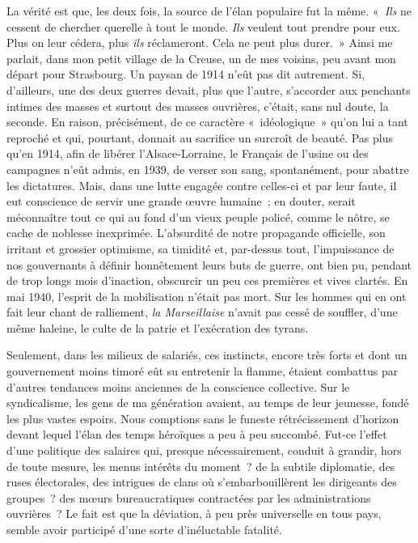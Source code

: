 \documentclass[french,twoside]{book} %
\begin{document}
La vérité est que, les deux fois, la source de l’élan   populaire fut la même. « {\itshape Ils} ne cessent de chercher querelle à tout le monde. {\itshape Ils} veulent tout prendre pour eux. Plus on leur cédera, plus {\itshape ils} réclameront. Cela ne peut plus durer. » Ainsi me parlait, dans mon petit village de la Creuse, un de mes voisins, peu avant mon départ pour Strasbourg. Un paysan de 1914 n’eût pas dit autrement. Si, d’ailleurs, une des deux guerres devait, plus que l’autre, s’accorder aux penchants intimes des masses et surtout des masses ouvrières, c’était, sans nul doute, la seconde. En raison, précisément, de ce caractère « idéologique » qu’on lui a tant reproché et qui, pourtant, donnait au sacrifice un surcroît de beauté. Pas plus qu’en 1914, afin de libérer l’Alsace-Lorraine, le Français de l’usine ou des campagnes n’eût admis, en 1939, de verser son sang, spontanément, pour abattre les dictatures. Mais, dans une lutte engagée contre celles-ci et par leur faute, il eut conscience de servir une grande œuvre humaine ; en douter, serait méconnaître tout ce qui au fond d’un vieux peuple policé, comme le nôtre, se cache de noblesse inexprimée. L’absurdité de notre propagande officielle, son irritant et grossier optimisme, sa timidité et, par-dessus tout, l’impuissance de nos gouvernants à définir honnêtement leurs buts de guerre, ont bien pu, pendant de trop longs mois d’inaction, obscurcir un peu ces premières et vives clartés. En mai 1940, l’esprit de la mobilisation n’était pas mort. Sur les hommes qui en ont fait leur chant de ralliement, {\itshape la Marseillaise} n’avait pas cessé de souffler, d’une même haleine, le culte de la patrie et l’exécration des tyrans.\par
Seulement, dans les milieux de salariés, ces instincts, encore très forts et dont un gouvernement moins timoré eût su entretenir la flamme, étaient combattus par d’autres tendances moins anciennes de la conscience collective. Sur le syndicalisme, les gens de ma génération avaient, au temps de leur jeunesse, fondé les plus vastes espoirs. Nous   comptions sans le funeste rétrécissement d’horizon devant lequel l’élan des temps héroïques a peu à peu succombé. Fut-ce l’effet d’une politique des salaires qui, presque nécessairement, conduit à grandir, hors de toute mesure, les menus intérêts du moment ? de la subtile diplomatie, des ruses électorales, des intrigues de clans où s’embarbouillèrent les dirigeants des groupes ? des mœurs bureaucratiques contractées par les administrations ouvrières ? Le fait est que la déviation, à peu près universelle en tous pays, semble avoir participé d’une sorte d’inéluctable fatalité.\par
\end{document}
